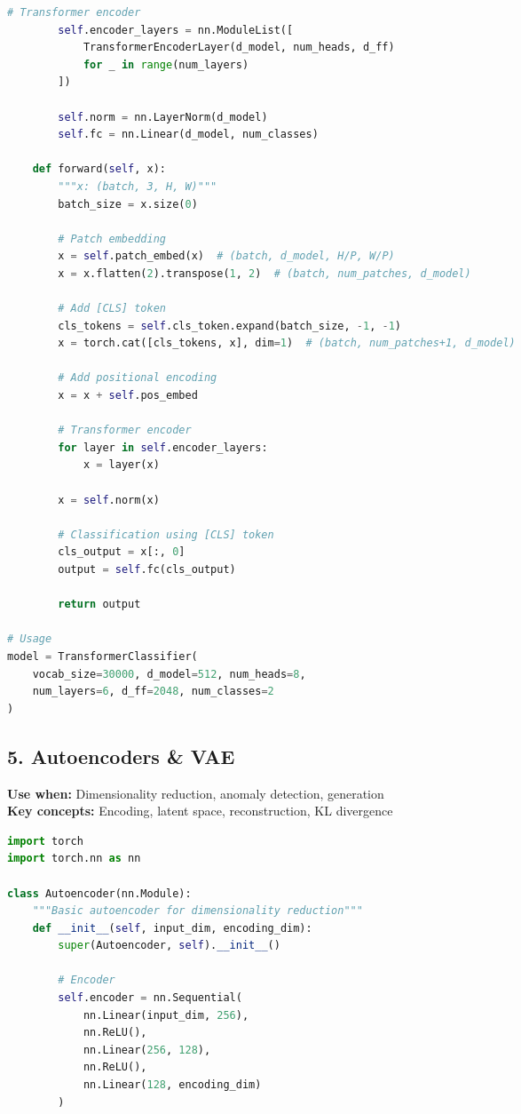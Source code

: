 \documentclass[8pt,landscape]{article}
\begin{document}
\begin{multicols}{3}
\begin{lstlisting}[language=Python]
        # Transformer encoder
        self.encoder_layers = nn.ModuleList([
            TransformerEncoderLayer(d_model, num_heads, d_ff)
            for _ in range(num_layers)
        ])

        self.norm = nn.LayerNorm(d_model)
        self.fc = nn.Linear(d_model, num_classes)

    def forward(self, x):
        """x: (batch, 3, H, W)"""
        batch_size = x.size(0)

        # Patch embedding
        x = self.patch_embed(x)  # (batch, d_model, H/P, W/P)
        x = x.flatten(2).transpose(1, 2)  # (batch, num_patches, d_model)

        # Add [CLS] token
        cls_tokens = self.cls_token.expand(batch_size, -1, -1)
        x = torch.cat([cls_tokens, x], dim=1)  # (batch, num_patches+1, d_model)

        # Add positional encoding
        x = x + self.pos_embed

        # Transformer encoder
        for layer in self.encoder_layers:
            x = layer(x)

        x = self.norm(x)

        # Classification using [CLS] token
        cls_output = x[:, 0]
        output = self.fc(cls_output)

        return output

# Usage
model = TransformerClassifier(
    vocab_size=30000, d_model=512, num_heads=8,
    num_layers=6, d_ff=2048, num_classes=2
)
\end{lstlisting}

\subsection*{5. Autoencoders \& VAE}
\textbf{Use when:} Dimensionality reduction, anomaly detection, generation \\
\textbf{Key concepts:} Encoding, latent space, reconstruction, KL divergence
\begin{lstlisting}[language=Python]
import torch
import torch.nn as nn

class Autoencoder(nn.Module):
    """Basic autoencoder for dimensionality reduction"""
    def __init__(self, input_dim, encoding_dim):
        super(Autoencoder, self).__init__()

        # Encoder
        self.encoder = nn.Sequential(
            nn.Linear(input_dim, 256),
            nn.ReLU(),
            nn.Linear(256, 128),
            nn.ReLU(),
            nn.Linear(128, encoding_dim)
        )


\end{lstlisting}
\end{multicols}
\end{document}
